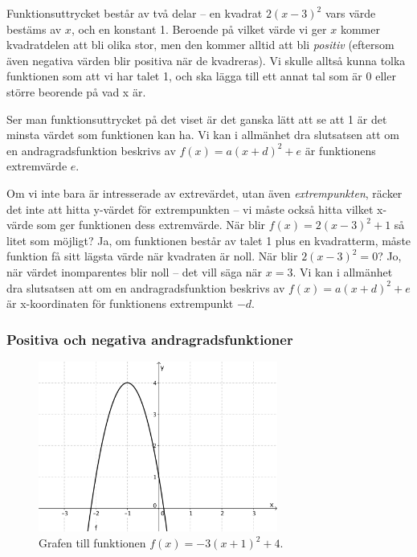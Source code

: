 Funktionsuttrycket består av två delar -- en kvadrat $2(x-3)^2$ vars värde bestäms av $x$, och en konstant 1.
Beroende på vilket värde vi ger $x$ kommer kvadratdelen att bli olika stor, men den kommer alltid att bli \emph{positiv} (eftersom även negativa värden blir positiva när de kvadreras).
Vi skulle alltså kunna tolka funktionen som att vi har talet 1, och ska lägga till ett annat tal som är 0 eller större beorende på vad x är.

Ser man funktionsuttrycket på det viset är det ganska lätt att se att 1 är det minsta värdet som funktionen kan ha.
Vi kan i allmänhet dra slutsatsen att om en andragradsfunktion beskrivs av $f(x)=a(x+d)^2+e$ är funktionens extremvärde $e$.

Om vi inte bara är intresserade av extrevärdet, utan även \emph{extrempunkten}, räcker det inte att hitta y-värdet för extrempunkten -- vi måste också hitta vilket x-värde som ger funktionen dess extremvärde.
När blir $f(x) = 2(x-3)^2+1$ så litet som möjligt?
Ja, om funktionen består av talet 1 plus en kvadratterm, måste funktion få sitt lägsta värde när kvadraten är noll.
När blir $2(x-3)^2 = 0$? Jo, när värdet inomparentes blir noll -- det vill säga när $x = 3$.
Vi kan i allmänhet dra slutsatsen att om en andragradsfunktion beskrivs av $f(x)=a(x+d)^2+e$ är x-koordinaten för funktionens extrempunkt $-d$.

\subsubsection{Positiva och negativa andragradsfunktioner}

\begin{figure}
  \centering
  \includegraphics[width=0.7\textwidth]{bilder/negkurva1.png}
  \caption{\label{fig:negkurva1}Grafen till funktionen $f(x)=-3(x+1)^2+4$.}
\end{figure}

